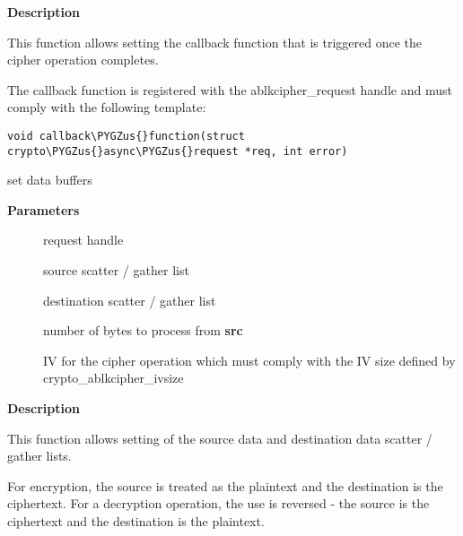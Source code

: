 \documentclass[a4paper,8pt,english]{sphinxmanual}
\def\PYGZus{\char`\_}
\begin{document}
\textbf{Description}

This function allows setting the callback function that is triggered once the
cipher operation completes.

The callback function is registered with the ablkcipher\_request handle and
must comply with the following template:

\begin{Verbatim}[commandchars=\\\{\}]
void callback\PYGZus{}function(struct crypto\PYGZus{}async\PYGZus{}request *req, int error)
\end{Verbatim}

\begin{fulllineitems}
\label{crypto/api-skcipher:c.ablkcipher_request_set_crypt}
set data buffers

\end{fulllineitems}


\textbf{Parameters}
\begin{description}
\item[{}] \leavevmode
request handle

\item[{}] \leavevmode
source scatter / gather list

\item[{}] \leavevmode
destination scatter / gather list

\item[{}] \leavevmode
number of bytes to process from \textbf{src}

\item[{}] \leavevmode
IV for the cipher operation which must comply with the IV size defined
by crypto\_ablkcipher\_ivsize

\end{description}

\textbf{Description}

This function allows setting of the source data and destination data
scatter / gather lists.

For encryption, the source is treated as the plaintext and the
destination is the ciphertext. For a decryption operation, the use is
reversed - the source is the ciphertext and the destination is the plaintext.
\end{document}
